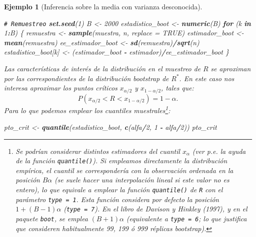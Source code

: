 \documentclass[
  spanish,
  10pt,
]{book}
\newenvironment{Shaded}{\begin{snugshade}}{\end{snugshade}}
\newcommand{\AttributeTok}[1]{\textcolor[rgb]{0.13,0.29,0.53}{#1}}
\newcommand{\CommentTok}[1]{\textcolor[rgb]{0.56,0.35,0.01}{\textit{#1}}}
\newcommand{\ConstantTok}[1]{\textcolor[rgb]{0.56,0.35,0.01}{#1}}
\newcommand{\ControlFlowTok}[1]{\textcolor[rgb]{0.13,0.29,0.53}{\textbf{#1}}}
\newcommand{\DecValTok}[1]{\textcolor[rgb]{0.00,0.00,0.81}{#1}}
\newcommand{\FunctionTok}[1]{\textcolor[rgb]{0.13,0.29,0.53}{\textbf{#1}}}
\newcommand{\NormalTok}[1]{#1}
\newcommand{\OtherTok}[1]{\textcolor[rgb]{0.56,0.35,0.01}{#1}}
\newcommand{\SpecialCharTok}[1]{\textcolor[rgb]{0.81,0.36,0.00}{\textbf{#1}}}
\theoremstyle{break}
\newtheorem{example}{Ejemplo}[chapter]
\theoremstyle{nonumberplain}
\renewcommand{\CommentTok}[1]{\textcolor[rgb]{0.41,0.41,0.41}{\texttt{#1}}}
\let\oldfootnote\footnote
\renewcommand\footnote[1]{\oldfootnote{\hspace{2mm}#1}}
\begin{document}
\begin{example}[Inferencia sobre la media con varianza desconocida]
\begin{Shaded}
\begin{Highlighting}[]
\CommentTok{\# Remuestreo}
\FunctionTok{set.seed}\NormalTok{(}\DecValTok{1}\NormalTok{)}
\NormalTok{B }\OtherTok{\textless{}{-}} \DecValTok{2000}
\NormalTok{estadistico\_boot }\OtherTok{\textless{}{-}} \FunctionTok{numeric}\NormalTok{(B)}
\ControlFlowTok{for}\NormalTok{ (k }\ControlFlowTok{in} \DecValTok{1}\SpecialCharTok{:}\NormalTok{B) \{}
\NormalTok{  remuestra }\OtherTok{\textless{}{-}} \FunctionTok{sample}\NormalTok{(muestra, n, }\AttributeTok{replace =} \ConstantTok{TRUE}\NormalTok{)}
\NormalTok{  estimador\_boot }\OtherTok{\textless{}{-}} \FunctionTok{mean}\NormalTok{(remuestra)}
\NormalTok{  ee\_estimador\_boot }\OtherTok{\textless{}{-}} \FunctionTok{sd}\NormalTok{(remuestra)}\SpecialCharTok{/}\FunctionTok{sqrt}\NormalTok{(n)}
\NormalTok{  estadistico\_boot[k] }\OtherTok{\textless{}{-}}\NormalTok{ (estimador\_boot }\SpecialCharTok{{-}}\NormalTok{ estimador)}\SpecialCharTok{/}\NormalTok{ee\_estimador\_boot}
\NormalTok{\}}
\end{Highlighting}
\end{Shaded}

Las características de interés de la distribución en el muestreo de \(R\)
se aproximan por las correspondientes de la distribución bootstrap de \(R^{\ast}\).
En este caso nos interesa aproximar los puntos críticos \(x_{\alpha /2}\) y
\(x_{1-\alpha /2}\), tales que:
\[P\left( x_{\alpha /2} < R < x_{1-\alpha /2} \right) = 1-\alpha.\]
Para lo que podemos emplear los cuantiles muestrales\footnote{
  Se podrían considerar distintos estimadores del cuantil \(x_{\alpha}\)
  (ver p.e. la ayuda de la función \texttt{quantile()}).
  Si empleamos directamente la distribución empírica, el cuantil se
  correspondería con la observación ordenada en la posición \(B \alpha\)
  (se suele hacer una interpolación lineal si este valor no es entero),
  lo que equivale a emplear la función \texttt{quantile()} de \texttt{R} con el parámetro
  \texttt{type\ =\ 1}. Esta función considera por defecto la posición
  \(1 + (B - 1) \alpha\) (\texttt{type\ =\ 7}).
  En el libro de Davison y Hinkley (1997), y en el paquete \texttt{boot}, se emplea \((B + 1) \alpha\) (equivalente a \texttt{type\ =\ 6}; lo que justifica que
  consideren habitualmente 99, 199 ó 999 réplicas bootstrap).}:

\begin{Shaded}
\begin{Highlighting}[]
\NormalTok{pto\_crit }\OtherTok{\textless{}{-}} \FunctionTok{quantile}\NormalTok{(estadistico\_boot, }\FunctionTok{c}\NormalTok{(alfa}\SpecialCharTok{/}\DecValTok{2}\NormalTok{, }\DecValTok{1} \SpecialCharTok{{-}}\NormalTok{ alfa}\SpecialCharTok{/}\DecValTok{2}\NormalTok{))}
\NormalTok{pto\_crit}
\end{Highlighting}
\end{Shaded}


\end{example}
\end{document}
